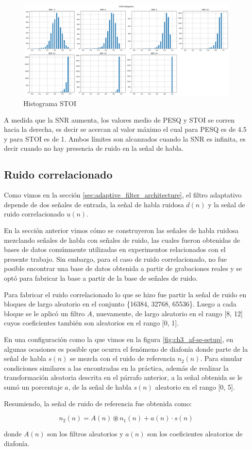 \begin{figure}[H]
	\centering
	\centerline{\includegraphics[scale=0.35]{images/ch5/stoi_aggregated.png}}
	\caption{Histograma STOI}
	\label{fig:ch5_stoi_histogram}
\end{figure}

A medida que la SNR aumenta, los valores medio de PESQ y STOI se corren hacia la derecha, es decir se acercan al valor máximo el cual para PESQ es de 4.5 y para STOI es de 1. Ambos límites son alcanzados cuando la SNR es infinita, es decir cuando no hay presencia de ruido en la señal de habla.

\subsection{Ruido correlacionado}

Como vimos en la sección \ref{sec:adaptive_filter_architecture}, el filtro adaptativo depende de dos señales de entrada, la señal de habla ruidosa $d(n)$ y la señal de ruido correlacionado $u(n)$. 

En la sección anterior vimos cómo se construyeron las señales de habla ruidosa mezclando señales de habla con señales de ruido, las cuales fueron obtenidas de bases de datos comúnmente utilizadas en experimentos relacionados con el presente trabajo. Sin embargo, para el caso de ruido correlacionado, no fue posible encontrar una base de datos obtenida a partir de grabaciones reales y se optó para fabricar la base a partir de la base de señales de ruido.

Para fabricar el ruido correlacionado lo que se hizo fue partir la señal de ruido en bloques de largo aleatorio en el conjunto \{16384, 32768, 65536\}. Luego a cada bloque se le aplicó un filtro $A$, nuevamente, de largo aleatorio en el rango [8, 12] cuyos coeficientes también son aleatorios en el rango [0, 1].

En una configuración como la que vimos en la figura \ref{fig:ch3_af-se-setup}, en algunas ocasiones es posible que ocurra el fenómeno de diafonía donde parte de la señal de habla $s(n)$ se mezcla con el ruido de referencia $n_2(n)$. Para simular condiciones similares a las encontradas en la práctica, además de realizar la transformación aleatoria descrita en el párrafo anterior, a la señal obtenida se le sumó un porcentaje $a$, de la señal de habla $s(n)$ aleatorio en el rango [0, 5].

Resumiendo, la señal de ruido de referencia fue obtenida como:

\begin{equation*}
	n_2(n) = A(n) \circledast n_1(n) + a(n) \cdot s(n)
\end{equation*}

\noindent donde $A(n)$ son los filtros aleatorios y $a(n)$ son los coeficientes aleatorios de diafonía.